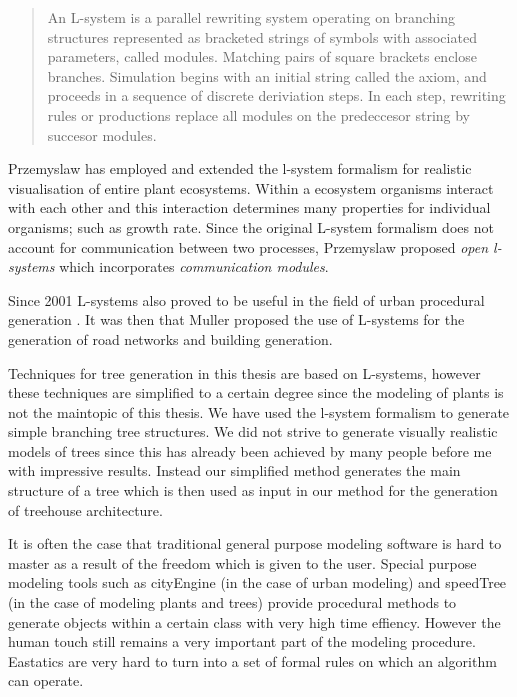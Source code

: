 \documentclass{article}
\begin{document}
\begin{quote}
An L-system is a parallel rewriting system operating on branching structures represented as bracketed strings of symbols with associated parameters, called modules. Matching pairs of square brackets enclose branches. Simulation begins with an  initial string called the axiom, and proceeds in a sequence of discrete deriviation steps. In each step, rewriting rules or productions replace all modules on the predeccesor string by succesor modules.   
\end{quote}   

Przemyslaw \cite{PrzemyslawPlants} has employed and extended the l-system formalism for realistic visualisation of entire plant ecosystems. Within a ecosystem organisms interact with each other and this interaction determines many properties for individual organisms; such as growth rate. Since the original L-system formalism does not account for communication between two processes, Przemyslaw proposed \emph{open l-systems} which incorporates \emph{communication modules}.    
  
Since 2001 L-systems also proved to be useful in the field of urban procedural generation \cite{Wonka03}. It was then that Muller proposed the use of L-systems for the generation of road networks and building generation. 


Techniques for tree generation in this thesis are based on L-systems, however these techniques are simplified to a certain degree since the modeling of plants is not the maintopic of this thesis. We have used the l-system formalism to generate simple branching tree structures. We did not strive to generate visually realistic models of trees since this has already been achieved by many people before me with impressive results. Instead our simplified method generates the main structure of a tree which is then used as input in our method for the generation of treehouse architecture. 


It is often the case that traditional general purpose modeling software is hard to master as a result of the freedom which is given to the user. Special purpose modeling tools such as cityEngine \cite{Muller06} (in the case of urban modeling) and speedTree (in the case of modeling plants and trees) provide procedural methods to generate objects within a certain class with very high time effiency. However the human touch still remains a very important part of the modeling procedure. Eastatics are very hard to turn into a set of formal rules on which an algorithm can operate.
\end{document}
